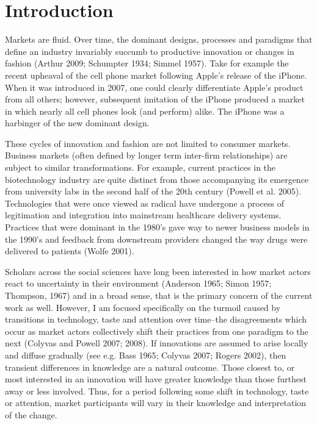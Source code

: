 \chapter{Introduction\label{intro}}

Markets are fluid. Over time, the dominant designs, processes and paradigms that define an industry invariably succumb to productive innovation or changes in fashion (Arthur 2009; Schumpter 1934; Simmel 1957). Take for example the recent upheaval of the cell phone market following Apple's release of the iPhone. When it was introduced in 2007, one could clearly differentiate Apple's product from all others; however, subsequent imitation of the iPhone produced a market in which nearly all cell phones look (and perform) alike. The iPhone was a harbinger of the new dominant design.

These cycles of innovation and fashion are not limited to consumer markets. Business markets (often defined by longer term inter-firm relationships) are subject to similar transformations. For example, current practices in the biotechnology industry are quite distinct from those accompanying its emergence from university labs in the second half of the 20th century (Powell et al. 2005). Technologies that were once viewed as radical have undergone a process of legitimation and integration into mainstream healthcare delivery systems. Practices that were dominant in the 1980's gave way to newer business models in the 1990's and feedback from downstream providers changed the way drugs were delivered to patients (Wolfe 2001). 

Scholars across the social sciences have long been interested in how market actors react to uncertainty in their environment (Anderson 1965; Simon 1957; Thompson, 1967) and in a broad sense, that is the primary concern of the current work as well. However, I am focused specifically on the turmoil caused by transitions in technology, taste and attention over time--the disagreements which occur as market actors collectively shift their practices from one paradigm to the next (Colyvas and Powell 2007; 2008). If innovations are assumed to arise locally and diffuse gradually (see e.g. Bass 1965; Colyvas 2007; Rogers 2002), then transient differences in knowledge are a natural outcome. Those closest to, or most interested in an innovation will have greater knowledge than those furthest away or less involved. Thus, for a period following some shift in technology, taste or attention, market participants will vary in their knowledge and interpretation of the change.

